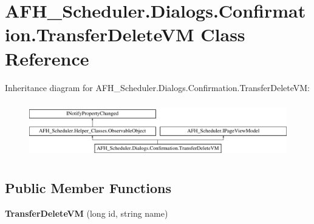 \section{A\+F\+H\+\_\+\+Scheduler.\+Dialogs.\+Confirmation.\+Transfer\+Delete\+VM Class Reference}
\label{class_a_f_h___scheduler_1_1_dialogs_1_1_confirmation_1_1_transfer_delete_v_m}
Inheritance diagram for A\+F\+H\+\_\+\+Scheduler.\+Dialogs.\+Confirmation.\+Transfer\+Delete\+VM\+:\begin{figure}[H]
\begin{center}
\leavevmode
\includegraphics[height=2.470588cm]{class_a_f_h___scheduler_1_1_dialogs_1_1_confirmation_1_1_transfer_delete_v_m}
\end{center}
\end{figure}
\subsection*{Public Member Functions}
\begin{DoxyCompactItemize}
\item 
\mbox{\label{class_a_f_h___scheduler_1_1_dialogs_1_1_confirmation_1_1_transfer_delete_v_m_a681b9fcafb134db17debab341e75687a}} 
{\bfseries Transfer\+Delete\+VM} (long id, string name)
\end{DoxyCompactItemize}
